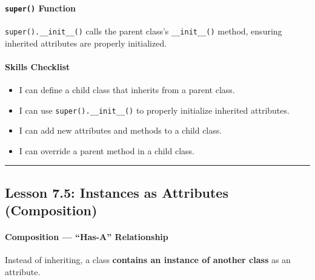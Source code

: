 \documentclass[
  justified,
  openright,
]{tufte-book}
\let\subsubsection\paragraph
\let\paragraph\paragraph
\let\subsubsection\paragraph
\let\paragraph\paragraph
\providecommand{\tightlist}{%
  \setlength{\itemsep}{0pt}\setlength{\parskip}{0pt}}
\begin{document}
\subsubsection{\texorpdfstring{\texttt{super()}
Function}{super() Function}}\label{super-function}

\texttt{super().\_\_init\_\_()} calls the parent class's
\texttt{\_\_init\_\_()} method, ensuring inherited attributes are
properly initialized.

\subsubsection{Skills Checklist}\label{skills-checklist-35}

\begin{itemize}
\tightlist
\item[$\square$]
  I can define a child class that inherits from a parent class.
\item[$\square$]
  I can use \texttt{super().\_\_init\_\_()} to properly initialize
  inherited attributes.
\item[$\square$]
  I can add new attributes and methods to a child class.
\item[$\square$]
  I can override a parent method in a child class.
\end{itemize}

\begin{center}\rule{0.5\linewidth}{0.5pt}\end{center}

\subsection{Lesson 7.5: Instances as Attributes
(Composition)}\label{lesson-7.5-instances-as-attributes-composition}

\subsubsection{Composition --- ``Has-A''
Relationship}\label{composition-has-a-relationship}

Instead of inheriting, a class \textbf{contains an instance of another
class} as an attribute.
\end{document}
